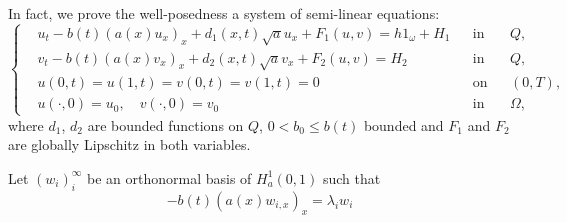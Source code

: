 \documentclass[11pt,oneside,a4papper]{osajnl}
\begin{document}
\begin{itemize}
In fact, we prove the well-posedness a system of semi-linear equations:
\begin{equation}\label{PDE_annexe}
	\left\{\begin{aligned}
		&u_t - b(t) \left(a(x) u_{x}\right)_{x} + d_1(x,t)\sqrt{a}u_x + F_1(u,v) = h 1_{\omega} + H_1 &&\text{in} && Q,\\
        &v_t - b(t) \left(a(x) v_{x}\right)_{x} + d_2(x,t)\sqrt{a}v_x + F_2(u,v) = H_2 &&\text{in}&& Q,\\
		&u(0,t)=u(1,t)=v(0,t)=v(1,t)=0&&\text{on} && (0,T), \\
		&u(\cdot,0) = u_0, \quad v(\cdot,0) = v_0 &&\text{in} && \Omega,
	\end{aligned}
	\right.
\end{equation}
where $d_1$, $d_2$ are bounded functions on $Q$, $0 < b_0 \leq b(t)$ bounded
and $F_1$ and $F_2$ are globally Lipschitz in both variables.


Let $(w_{i})_{i}^{\infty}$ be an orthonormal basis of $H^{1}_{a}(0,1)$ such that 
\begin{equation*}
	-b(t)(a(x)w_{i,x})_{x}=\lambda_{i}w_{i}    
\end{equation*}


\end{itemize}
\end{document}
